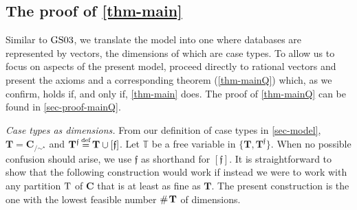 \documentclass[ecta,nameyear,draft]{econsocart}
\makeatletter
\newcommand{\reg}{\operatorname{reg}}
\newcommand{\countof}{\mathbin{\#}\hskip1pt}
\newcommand{\mbb}{\mathbb}
\newcommand{\mc}{\mathcal}
\newcommand\defeq{\mathrel{\overset{\makebox[0pt]{\mbox{\normalfont\tiny def}}}{=}}}%
\newcommand{\novel}{\mathfrak f}
\newcommand{\nnint}{{\mbb Z}_{\mplus}}
\newcommand\mplus{\text{\srcsize$+$}}
\newcommand{\preceqb}{\mathbin{\preceq}}
\newcommand{\ext}{\mathrel{\mc R}}
\newcommand{\supext}{{\ext}}
\newcommand{\mbbd}{{\mathbf D}}
\newcommand{\mbbc}{{\mathbf C}}
\newcommand{\mbbt}{{\mathbf {T}}}
\newcommand{\mbbtp}{{\mathbf{T}^\novel}}
\newcommand{\mbbtpp}{{\mathds{T}}}
\newcommand{\mbbi}{{\mathbf L}}
\newcommand{\mbbip}{{\mathbf{L}^{\novel}}}
\newcommand{\srcsize}{\@setfontsize{\srcsize}{3pt}{3pt}}
\newcommand{\gsii}{$\textup{GS03}$}
\theoremstyle{plain}
\theoremstyle{remark}
\makeatother
\begin{document}
\makeatletter
\def\@seccntformat#1{Appendix\,\csname the#1\endcsname.\quad}
\makeatother
\begin{appendix}
  \section{The proof of \cref{thm-main}}\label{sec-proof-main}




  Similar to \gsii, we  translate the model into one where databases are
  represented by vectors, the dimensions of which are case types. To allow us
  to focus on aspects of the present model,  proceed directly to rational
  vectors and present the axioms  and a corresponding theorem
  (\cref{thm-mainQ}) which, as we confirm, holds if, and only if, 
  \cref{thm-main} does. The proof of \cref{thm-mainQ} can be found in
  \cref{sec-proof-mainQ}.


  \emph{Case types as dimensions.} From our definition
  of case types in  \cref{sec-model}, $\mbbt = \mbbc_{/\sim^{\star}}$ and
  $\mbbt^\novel \defeq \mbbt\cup [ \novel ]$. Let $\mbbtpp$ be a free variable
  in $\{\mbbt , \mbbtp \}$.  When no possible confusion should arise, we use
  $\novel$ as shorthand for $[ \novel ]$.  It is straightforward to show that
  the following construction would work if instead we were to work with any
  partition $\textup T$ of $\mbbc$ that is at least as fine as $\mbbt$.
  The present construction is the one with the lowest feasible number
  $\countof \mbbt$ of dimensions.



\end{appendix}
\end{document}
